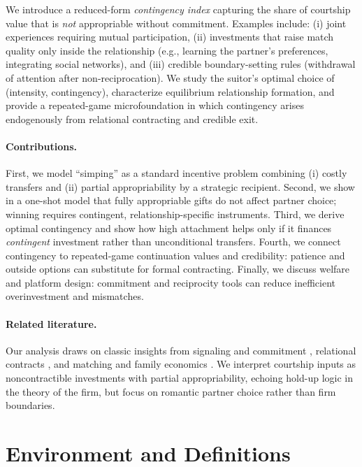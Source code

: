 \documentclass[AER]{AEA}
\begin{document}
We introduce a reduced-form \emph{contingency index} capturing the share of courtship value that is \emph{not} appropriable without commitment.
Examples include:
(i) joint experiences requiring mutual participation,
(ii) investments that raise match quality only inside the relationship (e.g., learning the partner's preferences, integrating social networks), and
(iii) credible boundary-setting rules (withdrawal of attention after non-reciprocation).
We study the suitor's optimal choice of (intensity, contingency), characterize equilibrium relationship formation, and provide a repeated-game microfoundation in which contingency arises endogenously from relational contracting and credible exit.

\paragraph{Contributions.}
First, we model ``simping'' as a standard incentive problem combining (i) costly transfers and (ii) partial appropriability by a strategic recipient.
Second, we show in a one-shot model that fully appropriable gifts do not affect partner choice; winning requires contingent, relationship-specific instruments.
Third, we derive optimal contingency and show how high attachment helps only if it finances \emph{contingent} investment rather than unconditional transfers.
Fourth, we connect contingency to repeated-game continuation values and credibility: patience and outside options can substitute for formal contracting.
Finally, we discuss welfare and platform design: commitment and reciprocity tools can reduce inefficient overinvestment and mismatches.

\paragraph{Related literature.}
Our analysis draws on classic insights from signaling and commitment \citep{Spence1973, FudenbergTirole1991},
relational contracts \citep{BakerGibbonsMurphy2002, MailathSamuelson2006},
and matching and family economics \citep{Becker1973, GaleShapley1962}.
We interpret courtship inputs as noncontractible investments with partial appropriability, echoing hold-up logic in the theory of the firm, but focus on romantic partner choice rather than firm boundaries.

\section{Environment and Definitions}
\end{document}
